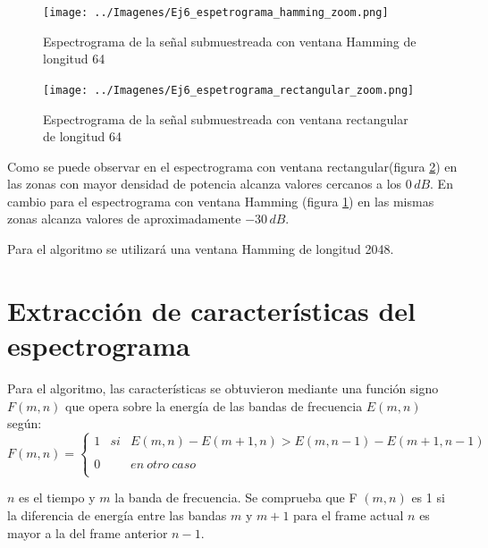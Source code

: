 \documentclass[10pt,spanish,a4paper,openany,notitlepage]{article}
\begin{document}
\begin{figure}[H] %
\begin{center}
\texttt{[image: ../Imagenes/Ej6\_espetrograma\_hamming\_zoom.png]}
\caption{Espectrograma de la señal submuestreada con ventana Hamming de longitud 64}
 \label{fig:hamm_zoom}
\end{center}
\end{figure}

\begin{figure}[H] %
\begin{center}
\texttt{[image: ../Imagenes/Ej6\_espetrograma\_rectangular\_zoom.png]}
\caption{Espectrograma de la señal submuestreada con ventana rectangular de longitud 64}
 \label{fig:rect_zoom}
\end{center}
\end{figure}

Como se puede observar en el espectrograma con ventana rectangular(figura \ref{fig:rect_zoom})
en las zonas con mayor densidad de potencia alcanza valores cercanos
a los $0\, \unit{dB}$. En cambio para el espectrograma con ventana Hamming
(figura \ref{fig:hamm_zoom}) en las mismas zonas alcanza valores de 
aproximadamente $-30\, \unit{dB}$.

Para el algoritmo se utilizará una ventana Hamming de longitud 2048.

\section{Extracción de características del espectrograma}

Para el algoritmo, las características se obtuvieron mediante una función signo $ F(m,n)$
que opera sobre la energía de las bandas de frecuencia $E(m,n)$  según:\\

\begin{equation}
F(m,n)= \left\{ \begin{array}{lcc}
             1 &   si  & E(m,n) - E(m+1,n) > E(m,n-1) - E(m+1,n-1) \\
             \\0 &  & en\ otro\ caso \\
             \end{array}
   \right.
\end{equation}

$n$ es el tiempo y $m$ la banda de frecuencia. Se comprueba que F $(m,n)$ es 1 si la diferencia de
energía entre las bandas $m$ y $ m+1$ para el frame actual $n$ es mayor a la del frame anterior
$n-1$.
\end{document}
